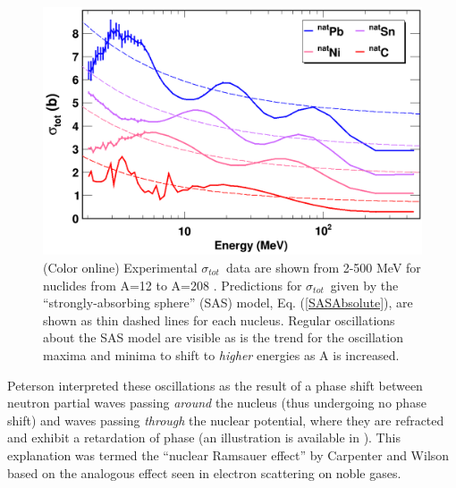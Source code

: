 \documentclass[twocolumn,secnumarabic,amssymb, nobibnotes, aps, prl,
superscriptaddress, nobalancelastpage, draft]{revtex4}
\newcommand{\tot}{\ensuremath{\sigma_{tot}}}
\begin{document}
\begin{figure}
    \includegraphics[width=\linewidth]{figures/ExampleTCS.png}
    \caption{
        (Color online) Experimental \tot\ data are shown from 2-500
        MeV for nuclides from A=12 to A=208
        \cite{Finlay1993, Schwartz1974, Poenitz1983, Abfalterer2000, Abfalterer2001}.
        Predictions for \tot\ given by the ``strongly-absorbing sphere'' (SAS)
        model, Eq. (\ref{SASAbsolute}), are shown as thin dashed lines for each nucleus.
        Regular oscillations about the SAS model are visible
        as is the trend for the oscillation
        maxima and minima to shift to \textit{higher} energies as A is increased.
    }
    \label{SASphereVsExperiment}
\end{figure}
Peterson \cite{Peterson1962} interpreted these oscillations as the 
result of a phase shift between neutron partial waves passing \textit{around} the 
nucleus (thus undergoing no phase shift) and waves passing
\textit{through} the nuclear potential, where they are refracted and exhibit a 
retardation of phase (an illustration is available in \cite{Satchler1980}).
This explanation was termed the 
``nuclear Ramsauer effect'' by Carpenter and Wilson \cite{Carpenter1959} based on 
the analogous effect seen in electron scattering on noble gases.
\end{document}
